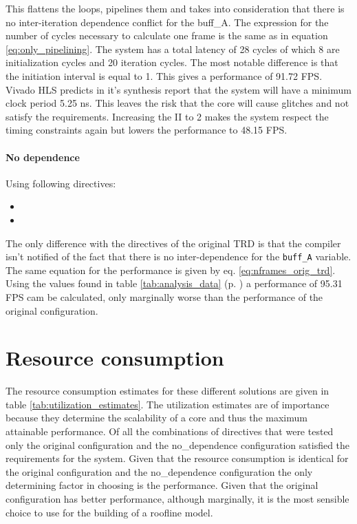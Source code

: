 This flattens the loops, pipelines them and takes into consideration that there is no inter-iteration dependence conflict for the buff\_A. The expression for the number of cycles necessary to calculate one frame is the same as in equation \ref{eq:only_pipelining}. The system has a total latency of 28 cycles of which 8 are initialization cycles and 20 iteration cycles. The most notable difference is that the initiation interval is equal to 1. This gives a performance of 91.72 FPS. Vivado HLS predicts in it's synthesis report that the system will have a minimum clock period 5.25 ns. This leaves the risk that the core will cause glitches and not satisfy the requirements. Increasing the II to 2 makes the system respect the timing constraints again but lowers the performance to 48.15 FPS. 

\paragraph{No dependence}
Using following directives:

\begin{itemize}
\item {}
\item {}
\end{itemize}

The only difference with the directives of the original TRD is that the compiler isn't notified of the fact that there is no inter-dependence for the \texttt{buff\_A} variable. The same equation for the performance is given by eq. \ref{eq:nframes_orig_trd}. Using the values found in table 
\ref{tab:analysis_data} (p. \pageref{tab:analysis_data}) a performance of 95.31 FPS cam be calculated, only marginally worse than the performance of the original configuration. 


\section{Resource consumption}

The resource consumption estimates for these different solutions are given in table \ref{tab:utilization_estimates}. The utilization estimates are of importance because they determine the scalability of a core and thus the maximum attainable performance. Of all the combinations of directives that were tested only the original configuration and the no\_dependence configuration satisfied the requirements for the system. Given that the resource consumption is identical for the original configuration and the no\_dependence configuration the only determining factor in choosing is the performance. Given that the original configuration has better performance, although marginally, it is the most sensible choice to use for the building of a roofline model.\\

